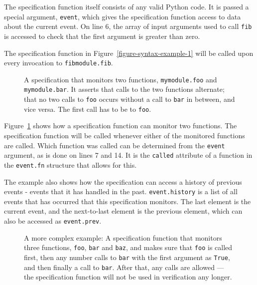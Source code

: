\documentclass[a4paper,11pt]{kth-mag}
\begin{document}
The specification function itself consists of any valid Python code. It is
passed a special argument, \texttt{event}, which gives the specification
function access to data about the current event. On line 6, the array of input
arguments used to call \texttt{fib} is accessed to check that the first
argument is greater than zero.

The specification function in Figure~\ref{figure-syntax-example-1} will be
called upon every invocation to \texttt{fibmodule.fib}.

\begin{figure}[h!]
	\begin{center}
	\begin{minipage}{0.7\textwidth}
	
	\end{minipage}
	\end{center}

	\caption{A specification that monitors two functions, \texttt{mymodule.foo}
		and \texttt{mymodule.bar}. It asserts that calls to the two functions
		alternate; that no two calls to \texttt{foo} occurs without a call to
		\texttt{bar} in between, and vice versa. The first call has to be to
		\texttt{foo}.}
	\label{figure-syntax-example-2}
\end{figure}

Figure~\ref{figure-syntax-example-2} shows how a specification function can
monitor two functions. The specification function will be called whenever
either of the monitored functions are called. Which function was called can be
determined from the \texttt{event} argument, as is done on lines 7 and 14. It
is the \texttt{called} attribute of a function in the \texttt{event.fn}
structure that allows for this.

The example also shows how the specification can access a history of previous
events - events that it has handled in the past. \texttt{event.history} is a
list of all events that has occurred that this specification monitors. The last
element is the current event, and the next-to-last element is the previous
element, which can also be accessed as \texttt{event.prev}.

\begin{figure}[h!]
	\begin{center}
	\begin{minipage}{0.7\textwidth}
	
	\end{minipage}
	\end{center}

	\caption{A more complex example: A specification function that monitors three
		functions, \texttt{foo}, \texttt{bar} and \texttt{baz}, and makes sure that
		\texttt{foo} is called first, then any number calls to \texttt{bar} with
		the first argument as \texttt{True}, and then finally a call to
	\texttt{bar}. After that, any calls are allowed --- the specification function
will not be used in verification any longer.}
	\label{figure-syntax-example-3}
\end{figure}
\end{document}
